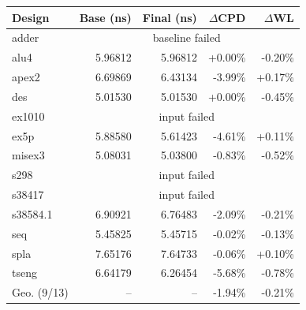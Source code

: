 \begin{tabular}{lrrrr}
\toprule
Design & Base (ns) & Final (ns) & $\Delta$CPD & $\Delta$WL \\
\midrule
adder & \multicolumn{4}{c}{baseline failed} \\
alu4 & 5.96812 & 5.96812 & +0.00\% & -0.20\% \\
apex2 & 6.69869 & 6.43134 & -3.99\% & +0.17\% \\
des & 5.01530 & 5.01530 & +0.00\% & -0.45\% \\
ex1010 & \multicolumn{4}{c}{input failed} \\
ex5p & 5.88580 & 5.61423 & -4.61\% & +0.11\% \\
misex3 & 5.08031 & 5.03800 & -0.83\% & -0.52\% \\
s298 & \multicolumn{4}{c}{input failed} \\
s38417 & \multicolumn{4}{c}{input failed} \\
s38584.1 & 6.90921 & 6.76483 & -2.09\% & -0.21\% \\
seq & 5.45825 & 5.45715 & -0.02\% & -0.13\% \\
spla & 7.65176 & 7.64733 & -0.06\% & +0.10\% \\
tseng & 6.64179 & 6.26454 & -5.68\% & -0.78\% \\
\midrule
Geo. (9/13) & -- & -- & -1.94\% & -0.21\% \\
\bottomrule
\end{tabular}
